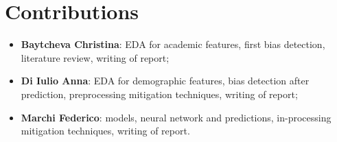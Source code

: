 \documentclass{article}
\begin{document}
\section{Contributions}
\begin{itemize}
    \item \textbf{Baytcheva Christina}: EDA for academic features, first bias detection, literature review, writing of report;
    \item \textbf{Di Iulio Anna}: EDA for demographic features, bias detection after prediction, preprocessing mitigation techniques, writing of report;
    \item \textbf{Marchi Federico}: models, neural network and predictions, in-processing mitigation techniques, writing of report.
\end{itemize}
\end{document}
